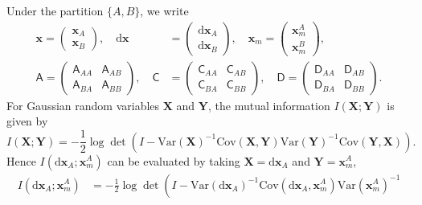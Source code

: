 \documentclass[
 longbibliography,
 twocolumn,
 superscriptaddress,
 amsmath,
 amssymb,
 amsthm,
 amsfonts,
 prl,
 floatfix,
]{revtex4-2}
\newcommand{\matbf}[1]{\boldsymbol{\mathsf{#1}}}
\begin{document}
\begin{widetext}
Under the partition $\{A,B\}$, we write
\begin{equation*}
    \begin{aligned}
        \bm x=
        \begin{pmatrix}
            \bm x_A\\\bm x_B
        \end{pmatrix},
        \quad
        \mathrm{d}\bm x&=
        \begin{pmatrix}
            \mathrm{d}\bm x_A\\\mathrm{d}\bm x_B
        \end{pmatrix},
        \quad
        \bm x_m=
        \begin{pmatrix}
            \bm{x}_m^A\\\bm x_m^B
        \end{pmatrix},
        \\
        \matbf{A}=\begin{pmatrix}
            \matbf{A}_{AA} & \matbf{A}_{AB} \\
            \matbf{A}_{BA} & \matbf{A}_{BB}
        \end{pmatrix},
        \quad
        \matbf{C}&=\begin{pmatrix}
            \matbf{C}_{AA} & \matbf{C}_{AB} \\
            \matbf{C}_{BA} & \matbf{C}_{BB}
        \end{pmatrix},
        \quad
        \matbf{D}=\begin{pmatrix}
            \matbf{D}_{AA} & \matbf{D}_{AB} \\
            \matbf{D}_{BA} & \matbf{D}_{BB}
        \end{pmatrix}.
    \end{aligned}
\end{equation*}
For Gaussian random variables $\bm X$ and $\bm Y$, the mutual information $I(\bm X;\bm Y)$ is given by
\[
    I(\bm X;\bm Y)
    =-\frac{1}{2}\log\det\left(
    I-\mathrm{Var}(\bm X)^{-1}
    \mathrm{Cov}(\bm X, \bm Y)
    \mathrm{Var}(\bm Y)^{-1}
    \mathrm{Cov}(\bm Y,\bm X)
    \right).
\]
Hence $I(\mathrm{d}\bm x_A;\bm x_m^A)$ can be evaluated by taking $\bm X=\mathrm d\bm x_A$ and $\bm Y=\bm x_m^A$,
\begin{equation*}
\begin{aligned}
    I(\mathrm d\bm x_A;\bm x_m^A)
    &=-\frac{1}{2}\log\det\left(
    I-\mathrm{Var}(\mathrm d\bm x_A)^{-1}
    \mathrm{Cov}(\mathrm d\bm x_A,\bm x_m^A)
    \mathrm{Var}(\bm x_m^A)^{-1}

\end{aligned}
\end{equation*}
\end{widetext}
\end{document}
